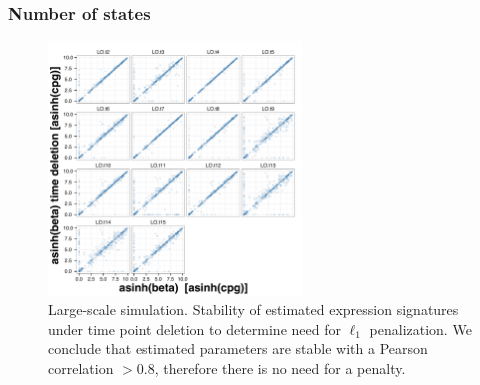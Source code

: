 \subsubsection{Number of states}
\label{sec:number-states-res}

\begin{figure}
  \centering
  \includegraphics[width=0.6\textwidth]{pics/no-pen-sim.pdf}
  \caption{Large-scale simulation. Stability of estimated expression signatures under time point deletion to determine need for $\ell_1$ penalization. We conclude that estimated parameters are stable with a Pearson correlation $>0.8$, therefore there is no need for a penalty.}
  \label{fig:lrg-sim-stab-l1}
\end{figure}

